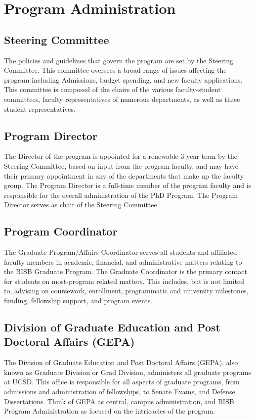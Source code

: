 \chapter{Program Administration}

\section{Steering Committee}
The policies and guidelines that govern the program are set by the Steering Committee. This committee oversees a broad range of issues affecting the program including Admissions, budget spending, and new faculty applications. This committee is composed of the chairs of the various faculty-student committees, faculty representatives of numerous departments, as well as three student representatives.

\section{Program Director}
The Director of the program is appointed for a renewable 3-year term by the Steering Committee, based on input from the program faculty, and may have their primary appointment in any of the departments that make up the faculty group. The Program Director is a full-time member of the program faculty and is responsible for the overall administration of the PhD Program. The Program Director serves as chair of the Steering Committee.

\section{Program Coordinator}
The Graduate Program/Affairs Coordinator serves all students and affiliated faculty members in academic, financial, and administrative matters relating to the BISB Graduate Program. The Graduate Coordinator is the primary contact for students on most-program related matters. This includes, but is not limited to, advising on coursework, enrollment, programmatic and university milestones, funding, fellowship support, and program events.

\section{Division of Graduate Education and Post Doctoral Affairs (GEPA)}
The Division of Graduate Education and Post Doctoral Affairs (GEPA), also known as Graduate Division or Grad Division, administers all graduate programs at UCSD. This office is responsible for all aspects of graduate programs, from admissions and administration of fellowships, to Senate Exams, and Defense Dissertations. Think of GEPA as central, campus administration, and BISB Program Administration as focused on the intricacies of the program.

